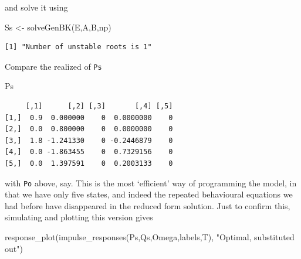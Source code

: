 \documentclass[
  letterpaper,
]{book}
\newenvironment{Shaded}{\begin{snugshade}}{\end{snugshade}}
\newcommand{\FunctionTok}[1]{\textcolor[rgb]{0.28,0.35,0.67}{#1}}
\newcommand{\NormalTok}[1]{\textcolor[rgb]{0.00,0.23,0.31}{#1}}
\newcommand{\OtherTok}[1]{\textcolor[rgb]{0.00,0.23,0.31}{#1}}
\newcommand{\SpecialCharTok}[1]{\textcolor[rgb]{0.37,0.37,0.37}{#1}}
\newcommand{\StringTok}[1]{\textcolor[rgb]{0.13,0.47,0.30}{#1}}
\begin{document}
and solve it using

\begin{Shaded}
\begin{Highlighting}[]
\NormalTok{Ss }\OtherTok{\textless{}{-}} \FunctionTok{solveGenBK}\NormalTok{(E,A,B,np)}
\end{Highlighting}
\end{Shaded}

\begin{verbatim}
[1] "Number of unstable roots is 1"
\end{verbatim}

\begin{Shaded}
\end{Shaded}

Compare the realized of \texttt{Ps}

\begin{Shaded}
\begin{Highlighting}[]
\NormalTok{Ps}
\end{Highlighting}
\end{Shaded}

\begin{verbatim}
     [,1]      [,2] [,3]       [,4] [,5]
[1,]  0.9  0.000000    0  0.0000000    0
[2,]  0.0  0.800000    0  0.0000000    0
[3,]  1.8 -1.241330    0 -0.2446879    0
[4,]  0.0 -1.863455    0  0.7329156    0
[5,]  0.0  1.397591    0  0.2003133    0
\end{verbatim}

with \texttt{Po} above, say. This is the most `efficient' way of
programming the model, in that we have only five states, and indeed the
repeated behavioural equations we had before have disappeared in the
reduced form solution. Just to confirm this, simulating and plotting
this version gives

\begin{Shaded}
\begin{Highlighting}[]
\FunctionTok{response\_plot}\NormalTok{(}\FunctionTok{impulse\_responses}\NormalTok{(Ps,Qs,Omega,labels,T), }\StringTok{"Optimal, substituted out"}\NormalTok{)}
\end{Highlighting}
\end{Shaded}
\end{document}
